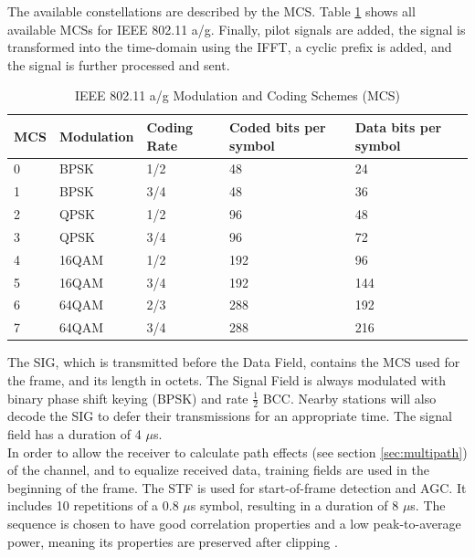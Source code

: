 The available constellations are described by the \gls{MCS}. Table \ref{tbl:mcs} shows all available \glspl{MCS} for \gls{IEEE} 802.11 a/g. Finally, pilot signals are added, the signal is transformed into the time-domain using the \gls{IFFT}, a cyclic prefix is added, and the signal is further processed and sent.

\begin{table}[ht]
	\centering
	\begin{tabular}{|p{2.5cm}|p{2.5cm}|p{2.5cm}|p{2.5cm}|p{2.5cm}|}
		\hline
		\textbf{MCS} & \textbf{Modulation} & \textbf{Coding Rate} & \textbf{Coded bits per symbol} & \textbf{Data bits per symbol} \\ \hline
		0 & BPSK & 1/2 & 48 & 24 \\ \hline
		1 & BPSK & 3/4 & 48 & 36 \\ \hline
		2 & QPSK & 1/2 & 96 & 48 \\ \hline
		3 & QPSK & 3/4 & 96 & 72 \\ \hline
		4 & 16QAM & 1/2 & 192 & 96 \\ \hline
		5 & 16QAM & 3/4 & 192 & 144 \\ \hline
		6 & 64QAM & 2/3 & 288 & 192 \\ \hline
		7 & 64QAM & 3/4 & 288 & 216 \\ \hline
	\end{tabular}
	\caption[IEEE 802.11 a/g Modulation and Coding Schemes]{IEEE 802.11 a/g Modulation and Coding Schemes (MCS) \cite{ieee2012} \label{tbl:mcs}}
\end{table}

The \gls{SIG}, which is transmitted before the Data Field, contains the \gls{MCS} used for the frame, and its length in octets. The Signal Field is always modulated with binary phase shift keying (BPSK) and rate $\frac{1}{2}$ \gls{BCC}. Nearby stations will also decode the \gls{SIG} to defer their transmissions for an appropriate time. The signal field has a duration of 4 $\mu$s.\\

In order to allow the receiver to calculate path effects (see section \ref{sec:multipath}) of the channel, and to equalize received data, training fields are used in the beginning of the frame. The \gls{STF} is used for start-of-frame detection and \gls{AGC}. It includes 10 repetitions of a 0.8 $\mu$s symbol, resulting in a duration of 8 $\mu$s. The sequence is chosen to have good correlation properties and a low peak-to-average power, meaning its properties are preserved after clipping \cite{perahia2013}.

